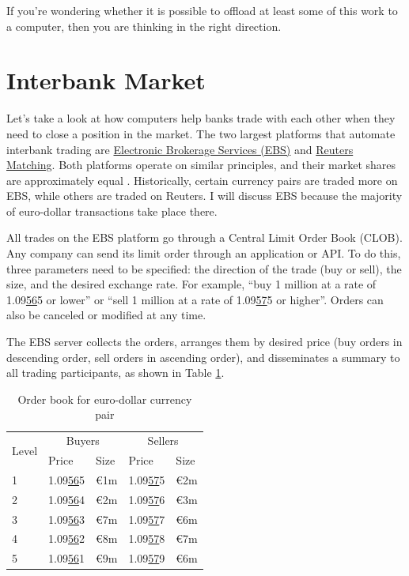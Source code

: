 \documentclass[a4paper,14pt]{extarticle}
\begin{document}
If you're wondering whether it is possible to offload at least some of this work 
to a computer, then you are thinking in the right direction.

\section*{Interbank Market}

Let's take a look at how computers help banks trade with each other when they 
need to close a position in the market. The two largest platforms that automate 
interbank trading are \href{https://www.cmegroup.com/trading/market-tech-and-data-services/ebs.html}{Electronic Brokerage Services (EBS)}
and
\href{https://www.refinitiv.com/en/products/spot-matching-forwards-matching}{Reuters Matching}.
Both platforms operate on similar principles, and their market shares are 
approximately equal \cite{golov2019fx}. Historically, certain currency pairs are 
traded more on EBS, while others are traded on Reuters. I will discuss EBS 
because the majority of euro-dollar transactions take place there.

All trades on the EBS platform go through a Central Limit Order Book 
(CLOB). Any company can 
send its limit order through an application or API. To do this, three 
parameters need to be specified: the direction of the trade (buy or sell), the 
size, and the desired exchange rate. For example, ``buy 1 million at a rate of 
1.09\underline{56}5 or lower'' or ``sell 1 million at a rate of 
1.09\underline{57}5 or higher''. Orders can also be canceled or modified at any 
time.

The EBS server collects the orders, arranges them by desired price (buy orders 
in descending order, sell orders in ascending order), and disseminates a summary 
to all trading participants, as shown in Table \ref{clob_table}.

\begin{table}[h]
\centering
\begin{tabular}{l|l|l|l|l}
\multirow{2}{*}{Level} & \multicolumn{2}{c|}{Buyers} &
\multicolumn{2}{c}{Sellers} \\ \cline{2-5}
& Price & Size & Price & Size \\ \hline
1 & 1.09\underline{56}5 & \euro1m & 1.09\underline{57}5 & \euro2m \\
2 & 1.09\underline{56}4 & \euro2m & 1.09\underline{57}6 & \euro3m \\
3 & 1.09\underline{56}3 & \euro7m & 1.09\underline{57}7 & \euro6m \\
4 & 1.09\underline{56}2 & \euro8m & 1.09\underline{57}8 & \euro7m \\
5 & 1.09\underline{56}1 & \euro9m & 1.09\underline{57}9 & \euro6m
\end{tabular}
\caption{Order book for euro-dollar currency pair}
\label{clob_table}
\end{table}
\end{document}
